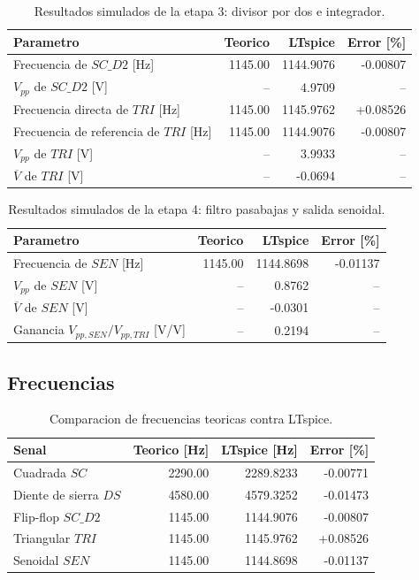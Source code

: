 ﻿\documentclass[11pt,letterpaper]{article}
\begin{document}
\begin{table}[H]
\centering
\begin{tabular}{lrrr}
\toprule
Parametro & Teorico & LTspice & Error [\%] \\
\midrule
Frecuencia de \(SC\_D2\) [Hz] & 1145.00 & 1144.9076 & -0.00807 \\
\(V_{pp}\) de \(SC\_D2\) [V] & -- & 4.9709 & -- \\
Frecuencia directa de \(TRI\) [Hz] & 1145.00 & 1145.9762 & +0.08526 \\
Frecuencia de referencia de \(TRI\) [Hz] & 1145.00 & 1144.9076 & -0.00807 \\
\(V_{pp}\) de \(TRI\) [V] & -- & 3.9933 & -- \\
\(\overline{V}\) de \(TRI\) [V] & -- & -0.0694 & -- \\
\bottomrule
\end{tabular}
\caption{Resultados simulados de la etapa 3: divisor por dos e integrador.}
\end{table}

\begin{table}[H]
\centering
\begin{tabular}{lrrr}
\toprule
Parametro & Teorico & LTspice & Error [\%] \\
\midrule
Frecuencia de \(SEN\) [Hz] & 1145.00 & 1144.8698 & -0.01137 \\
\(V_{pp}\) de \(SEN\) [V] & -- & 0.8762 & -- \\
\(\overline{V}\) de \(SEN\) [V] & -- & -0.0301 & -- \\
Ganancia \(V_{pp,SEN}/V_{pp,TRI}\) [V/V] & -- & 0.2194 & -- \\
\bottomrule
\end{tabular}
\caption{Resultados simulados de la etapa 4: filtro pasabajas y salida senoidal.}
\end{table}

\subsection{Frecuencias}

\begin{table}[H]
\centering
\begin{tabular}{lrrr}
\toprule
Senal & Teorico [Hz] & LTspice [Hz] & Error [\%] \\
\midrule
Cuadrada \(SC\) & 2290.00 & 2289.8233 & -0.00771 \\
Diente de sierra \(DS\) & 4580.00 & 4579.3252 & -0.01473 \\
Flip-flop \(SC\_D2\) & 1145.00 & 1144.9076 & -0.00807 \\
Triangular \(TRI\) & 1145.00 & 1145.9762 & +0.08526 \\
Senoidal \(SEN\) & 1145.00 & 1144.8698 & -0.01137 \\
\bottomrule
\end{tabular}
\caption{Comparacion de frecuencias teoricas contra LTspice.}
\end{table}
\end{document}
